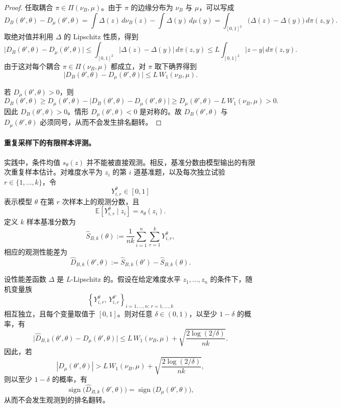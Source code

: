 \begin{proof}
任取耦合 $\pi \in \Pi(\nu_B,\mu)$。由于 $\pi$ 的边缘分布为 $\nu_B$ 与 $\mu$，可以写成
\[
D_B(\theta',\theta) - D_\mu(\theta',\theta)
=
\int \Delta(z)\, d\nu_B(z) - \int \Delta(y)\, d\mu(y)
=
\int_{[0,1]^2} \bigl(\Delta(z)-\Delta(y)\bigr)\, d\pi(z,y).
\]
取绝对值并利用 $\Delta$ 的 Lipschitz 性质，得到
\[
\bigl|D_B(\theta',\theta) - D_\mu(\theta',\theta)\bigr|
\le
\int_{[0,1]^2} |\Delta(z)-\Delta(y)|\, d\pi(z,y)
\le
L \int_{[0,1]^2} |z-y|\, d\pi(z,y).
\]
由于这对每个耦合 $\pi \in \Pi(\nu_B,\mu)$ 都成立，对 $\pi$ 取下确界得到
\[
\bigl|D_B(\theta',\theta) - D_\mu(\theta',\theta)\bigr|
\le
L\, W_1(\nu_B,\mu).
\]

若 $D_\mu(\theta',\theta) > 0$，则
\[
D_B(\theta',\theta)
\ge
D_\mu(\theta',\theta) - \bigl|D_B(\theta',\theta) - D_\mu(\theta',\theta)\bigr|
\ge
D_\mu(\theta',\theta) - L\,W_1(\nu_B,\mu)
>
0.
\]
因此 $D_B(\theta',\theta) > 0$。情形 $D_\mu(\theta',\theta) < 0$ 是对称的。故 $D_B(\theta',\theta)$ 与 $D_\mu(\theta',\theta)$ 必须同号，从而不会发生排名翻转。
\end{proof}


\paragraph{重复采样下的有限样本评测。}
实践中，条件均值 $s_\theta(z)$ 并不能被直接观测。相反，基准分数由模型输出的有限次重复样本估计。对难度水平为 $z_i$ 的第 $i$ 道基准题，以及每次独立试验 $r \in \{1,\dots,k\}$，令
\[
Y_{i,r}^{\theta} \in [0,1]
\]
表示模型 $\theta$ 在第 $r$ 次样本上的观测分数，且
\[
\mathbb{E}\!\left[Y_{i,r}^{\theta}\mid z_i\right] = s_\theta(z_i).
\]
定义 $k$ 样本基准分数为
\[
\widehat{S}_{B,k}(\theta)
:=
\frac{1}{nk}\sum_{i=1}^n \sum_{r=1}^k Y_{i,r}^{\theta},
\]
相应的观测性能差为
\[
\widehat{D}_{B,k}(\theta',\theta)
:=
\widehat{S}_{B,k}(\theta')-\widehat{S}_{B,k}(\theta).
\]

\begin{theorem}[重复采样下的有限样本分数扭曲与排序稳定性]
\label{thm:noisy_rank_stability}
设性能差函数 $\Delta$ 是 $L$-Lipschitz 的。假设在给定难度水平 $z_1,\dots,z_n$ 的条件下，随机变量族
\[
\left\{Y_{i,r}^{\theta},\, Y_{i,r}^{\theta'}\right\}_{i=1,\dots,n;\, r=1,\dots,k}
\]
相互独立，且每个变量取值于 $[0,1]$。则对任意 $\delta \in (0,1)$，以至少 $1-\delta$ 的概率，有
\[
\bigl|\widehat{D}_{B,k}(\theta',\theta)-D_\mu(\theta',\theta)\bigr|
\le
L\,W_1(\nu_B,\mu)
+
\sqrt{\frac{2\log(2/\delta)}{nk}}.
\]
因此，若
\[
|D_\mu(\theta',\theta)|
>
L\,W_1(\nu_B,\mu)
+
\sqrt{\frac{2\log(2/\delta)}{nk}},
\]
则以至少 $1-\delta$ 的概率，有
\[
\operatorname{sign}\!\bigl(\widehat{D}_{B,k}(\theta',\theta)\bigr)
=
\operatorname{sign}\!\bigl(D_\mu(\theta',\theta)\bigr),
\]
从而不会发生观测到的排名翻转。
\end{theorem}

